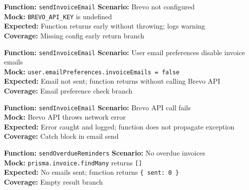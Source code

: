\documentclass[12pt,a4paper]{report}
\newcommand{\ptwo}{\textbf{\color{p2orange}P2}}
\begin{document}
\begin{tcolorbox}[testbox,title={EMAIL-001 \hfill \ptwo}]
\textbf{Function:} \texttt{sendInvoiceEmail} \quad \textbf{Scenario:} Brevo not configured \\
\textbf{Mock:} \texttt{BREVO\_API\_KEY} is undefined \\
\textbf{Expected:} Function returns early without throwing; logs warning \\
\textbf{Coverage:} Missing config early return branch
\end{tcolorbox}

\begin{tcolorbox}[testbox,title={EMAIL-002 \hfill \ptwo}]
\textbf{Function:} \texttt{sendInvoiceEmail} \quad \textbf{Scenario:} User email preferences disable invoice emails \\
\textbf{Mock:} \texttt{user.emailPreferences.invoiceEmails = false} \\
\textbf{Expected:} Email not sent; function returns without calling Brevo API \\
\textbf{Coverage:} Email preference check branch
\end{tcolorbox}

\begin{tcolorbox}[testbox,title={EMAIL-003 \hfill \ptwo}]
\textbf{Function:} \texttt{sendInvoiceEmail} \quad \textbf{Scenario:} Brevo API call fails \\
\textbf{Mock:} Brevo API throws network error \\
\textbf{Expected:} Error caught and logged; function does not propagate exception \\
\textbf{Coverage:} Catch block in email send
\end{tcolorbox}

\begin{tcolorbox}[testbox,title={EMAIL-004 \hfill \ptwo}]
\textbf{Function:} \texttt{sendOverdueReminders} \quad \textbf{Scenario:} No overdue invoices \\
\textbf{Mock:} \texttt{prisma.invoice.findMany} returns \texttt{[]} \\
\textbf{Expected:} No emails sent; function returns \texttt{\{ sent: 0 \}} \\
\textbf{Coverage:} Empty result branch
\end{tcolorbox}

\end{document}

